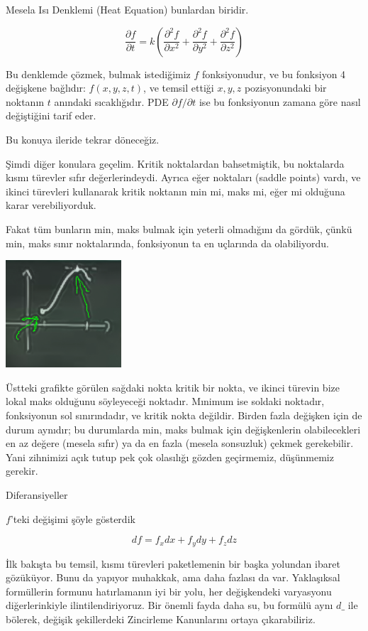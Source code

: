 \documentclass[12pt,fleqn]{article}\usepackage{../../common}
\begin{document}
Mesela Isı Denklemi (Heat Equation) bunlardan biridir. 

$$ \frac{\partial f}{\partial t}  = k (
\frac{\partial^2 f}{\partial x^2} + 
\frac{\partial^2 f}{\partial y^2} + 
\frac{\partial^2 f}{\partial z^2} )
$$

Bu denklemde çözmek, bulmak istediğimiz $f$ fonksiyonudur, ve bu
fonksiyon 4 değişkene bağlıdır: $f(x,y,z,t)$, ve temsil ettiği $x,y,z$
pozisyonundaki bir noktanın $t$ anındaki sıcaklığıdır. PDE
$\partial f/\partial t$ ise bu fonksiyonun zamana göre nasıl değiştiğini
tarif eder. 

Bu konuya ileride tekrar döneceğiz. 

Şimdi diğer konulara geçelim. Kritik noktalardan bahsetmiştik, bu
noktalarda kısmı türevler sıfır değerlerindeydi. Ayrıca eğer noktaları
(saddle points) vardı, ve ikinci türevleri kullanarak kritik noktanın min
mi, maks mi, eğer mi  olduğuna karar verebiliyorduk. 

Fakat tüm bunların min, maks bulmak için yeterli olmadığını da gördük,
çünkü min, maks sınır noktalarında, fonksiyonun ta en uçlarında da
olabiliyordu. 

\begin{center}
\includegraphics[height=4cm]{15_1.png}
\end{center}

Üstteki grafikte görülen sağdaki nokta kritik bir nokta, ve ikinci türevin bize
lokal maks olduğunu söyleyeceği noktadır. Mınimum ise soldaki noktadır,
fonksiyonun sol sınırındadır, ve kritik nokta değildir. Birden fazla değişken
için de durum aynıdır; bu durumlarda min, maks bulmak için değişkenlerin
olabilecekleri en az değere (mesela sıfır) ya da en fazla (mesela sonsuzluk)
çekmek gerekebilir. Yani zihnimizi açık tutup pek çok olasılığı gözden
geçirmemiz, düşünmemiz gerekir.

Diferansiyeller 

$f$'teki değişimi şöyle gösterdik

$$ df = f_xdx + f_ydy + f_zdz  $$

İlk bakışta bu temsil, kısmı türevleri paketlemenin bir başka yolundan
ibaret gözüküyor. Bunu da yapıyor muhakkak, ama daha fazlası da
var. Yaklaşıksal formüllerin formunu hatırlamanın iyi bir yolu, her
değişkendeki varyasyonu diğerlerinkiyle ilintilendiriyoruz. Bir önemli
fayda daha su, bu formülü aynı $d\_$ ile bölerek, değişik şekillerdeki
Zincirleme Kanunlarını ortaya çıkarabiliriz. 
\end{document}
